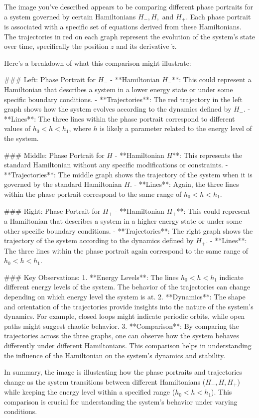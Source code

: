 The image you've described appears to be comparing different phase portraits for a system governed by certain Hamiltonians \( H_-, H, \) and \( H_+ \). Each phase portrait is associated with a specific set of equations derived from these Hamiltonians. The trajectories in red on each graph represent the evolution of the system's state over time, specifically the position \( z \) and its derivative \( \dot{z} \).

Here’s a breakdown of what this comparison might illustrate:

### Left: Phase Portrait for \( H_- \)
- **Hamiltonian \( H_- \)**: This could represent a Hamiltonian that describes a system in a lower energy state or under some specific boundary conditions.
- **Trajectories**: The red trajectory in the left graph shows how the system evolves according to the dynamics defined by \( H_- \).
- **Lines**: The three lines within the phase portrait correspond to different values of \( h_0 < h < h_1 \), where \( h \) is likely a parameter related to the energy level of the system.

### Middle: Phase Portrait for \( H \)
- **Hamiltonian \( H \)**: This represents the standard Hamiltonian without any specific modifications or constraints.
- **Trajectories**: The middle graph shows the trajectory of the system when it is governed by the standard Hamiltonian \( H \).
- **Lines**: Again, the three lines within the phase portrait correspond to the same range of \( h_0 < h < h_1 \).

### Right: Phase Portrait for \( H_+ \)
- **Hamiltonian \( H_+ \)**: This could represent a Hamiltonian that describes a system in a higher energy state or under some other specific boundary conditions.
- **Trajectories**: The right graph shows the trajectory of the system according to the dynamics defined by \( H_+ \).
- **Lines**: The three lines within the phase portrait again correspond to the same range of \( h_0 < h < h_1 \).

### Key Observations:
1. **Energy Levels**: The lines \( h_0 < h < h_1 \) indicate different energy levels of the system. The behavior of the trajectories can change depending on which energy level the system is at.
2. **Dynamics**: The shape and orientation of the trajectories provide insights into the nature of the system's dynamics. For example, closed loops might indicate periodic orbits, while open paths might suggest chaotic behavior.
3. **Comparison**: By comparing the trajectories across the three graphs, one can observe how the system behaves differently under different Hamiltonians. This comparison helps in understanding the influence of the Hamiltonian on the system's dynamics and stability.

In summary, the image is illustrating how the phase portraits and trajectories change as the system transitions between different Hamiltonians (\( H_-, H, H_+ \)) while keeping the energy level within a specified range (\( h_0 < h < h_1 \)). This comparison is crucial for understanding the system's behavior under varying conditions.